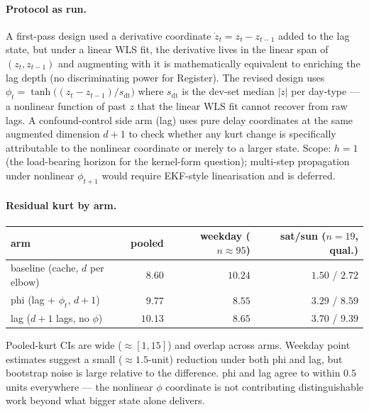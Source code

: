 \documentclass[11pt]{article}
\begin{document}
\paragraph{Protocol as run.} A first-pass design used a derivative
coordinate \(\dot z_t = z_t - z_{t-1}\) added to the lag state, but
under a linear WLS fit, the derivative lives in the linear span of
\((z_t, z_{t-1})\) and augmenting with it is mathematically
equivalent to enriching the lag depth (no discriminating power for
Register). The revised design uses
\(\phi_t = \tanh\!\bigl((z_t - z_{t-1}) / s_{\mathrm{dt}}\bigr)\)
where \(s_{\mathrm{dt}}\) is the dev-set median \(|\dot z|\) per
day-type --- a nonlinear function of past \(z\) that the linear WLS
fit cannot recover from raw lags. A confound-control side arm
(\textsf{lag}) uses pure delay coordinates at the same augmented
dimension \(d + 1\) to check whether any kurt change is specifically
attributable to the nonlinear coordinate or merely to a larger state.
Scope: \(h = 1\) (the load-bearing horizon for the kernel-form
question); multi-step propagation under nonlinear \(\phi_{t+1}\)
would require EKF-style linearisation and is deferred.

\paragraph{Residual kurt by arm.}
\begin{center}\small
\begin{tabular}{l r r r}
\toprule
arm & pooled & weekday (\(n{\approx}95\)) & sat/sun (\(n{=}19\), qual.) \\
\midrule
baseline (cache, \(d\) per elbow) & \(8.60\) & \(10.24\) & \(1.50\) / \(2.72\) \\
\textsf{phi} (lag + \(\phi_t\), \(d+1\)) & \(9.77\) & \(8.55\) & \(3.29\) / \(8.59\) \\
\textsf{lag} (\(d + 1\) lags, no \(\phi\)) & \(10.13\) & \(8.65\) & \(3.70\) / \(9.39\) \\
\bottomrule
\end{tabular}
\end{center}
Pooled-kurt CIs are wide (\(\approx [1, 15]\)) and overlap across
arms. Weekday point estimates suggest a small (\(\approx 1.5\)-unit)
reduction under both \textsf{phi} and \textsf{lag}, but bootstrap
noise is large relative to the difference. \textsf{phi} and
\textsf{lag} agree to within \(0.5\) units everywhere --- the
nonlinear \(\phi\) coordinate is not contributing distinguishable
work beyond what bigger state alone delivers.
\end{document}
